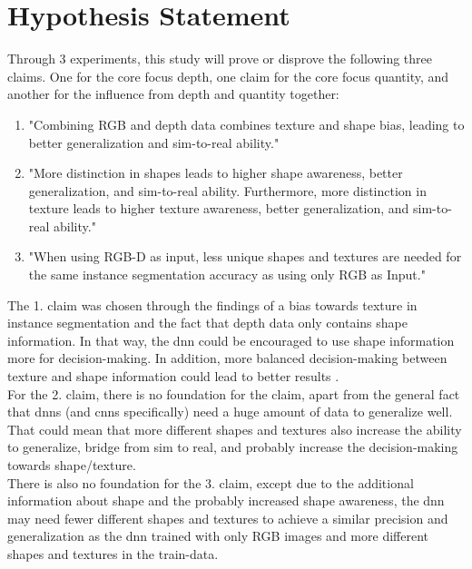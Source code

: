 	\section{Hypothesis Statement}
	\label{sec:hypothesis-statement}	
		Through 3 experiments, this study will prove or disprove the following three claims. One for the core focus depth, one claim for the core focus quantity, and another for the influence from depth and quantity together: 
		\begin{enumerate}
			\item "Combining RGB and depth data combines texture and shape bias, leading to better generalization and sim-to-real ability." %
			\item "More distinction in shapes leads to higher shape awareness, better generalization, and sim-to-real ability. Furthermore, more distinction in texture leads to higher texture awareness, better generalization, and sim-to-real ability."
			\item "When using RGB-D as input, less unique shapes and textures are needed for the same instance segmentation accuracy as using only RGB as Input."
		\end{enumerate}
		The 1. claim was chosen through the findings of a bias towards texture in instance segmentation \cite{Theodoridis2022} and the fact that depth data only contains shape information. In that way, the \ac{dnn} could be encouraged to use shape information more for decision-making. In addition, more balanced decision-making between texture and shape information could lead to better results \cite{Li2021}\cite{Co2021}\cite{Chung2023}.\\
		For the 2. claim, there is no foundation for the claim, apart from the general fact that \ac{dnn}s (and \ac{cnn}s specifically) need a huge amount of data to generalize well. That could mean that more different shapes and textures also increase the ability to generalize, bridge from sim to real, and probably increase the decision-making towards shape/texture.\\
		There is also no foundation for the 3. claim, except due to the additional information about shape and the probably increased shape awareness, the \ac{dnn} may need fewer different shapes and textures to achieve a similar precision and generalization as the \ac{dnn} trained with only RGB images and more different shapes and textures in the train-data.
	
	



			